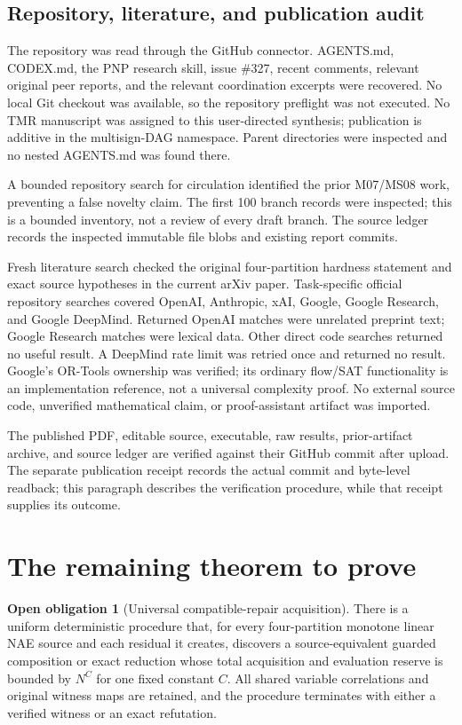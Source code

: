 \documentclass[11pt,letterpaper]{article}
\theoremstyle{definition}
\newtheorem{conjecture}[theorem]{Open obligation}
\begin{document}
\subsection{Repository, literature, and publication audit}

The repository was read through the GitHub connector. AGENTS.md, CODEX.md, the PNP research skill, issue \#327, recent comments, relevant original peer reports, and the relevant coordination excerpts were recovered. No local Git checkout was available, so the repository preflight was not executed. No TMR manuscript was assigned to this user-directed synthesis; publication is additive in the multisign-DAG namespace. Parent directories were inspected and no nested AGENTS.md was found there.

A bounded repository search for circulation identified the prior M07/MS08 work, preventing a false novelty claim. The first 100 branch records were inspected; this is a bounded inventory, not a review of every draft branch. The source ledger records the inspected immutable file blobs and existing report commits.

Fresh literature search checked the original four-partition hardness statement and exact source hypotheses in the current arXiv paper. Task-specific official repository searches covered OpenAI, Anthropic, xAI, Google, Google Research, and Google DeepMind. Returned OpenAI matches were unrelated preprint text; Google Research matches were lexical data. Other direct code searches returned no useful result. A DeepMind rate limit was retried once and returned no result. Google's OR-Tools ownership was verified; its ordinary flow/SAT functionality is an implementation reference, not a universal complexity proof. No external source code, unverified mathematical claim, or proof-assistant artifact was imported.

The published PDF, editable source, executable, raw results, prior-artifact archive, and source ledger are verified against their GitHub commit after upload. The separate publication receipt records the actual commit and byte-level readback; this paragraph describes the verification procedure, while that receipt supplies its outcome.

\section{The remaining theorem to prove}

\begin{conjecture}[Universal compatible-repair acquisition]\label{conj:gap}
There is a uniform deterministic procedure that, for every four-partition monotone linear NAE source and each residual it creates, discovers a source-equivalent guarded composition or exact reduction whose total acquisition and evaluation reserve is bounded by $N^C$ for one fixed constant $C$. All shared variable correlations and original witness maps are retained, and the procedure terminates with either a verified witness or an exact refutation.
\end{conjecture}
\end{document}

